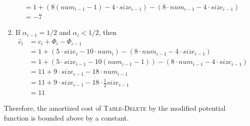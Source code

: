 \documentclass[12pt,letterpaper]{article}
\begin{document}
\begin{enumerate}
\begin{enumerate}
\begin{align*}
					&=1+(8(num_{i-1}-1)-4\cdot size_{i-1})-(8\cdot num_{i-1}-4\cdot size_{i-1})\\
					&=-7
				\end{align*}
			\item If $\alpha_{i-1}=1/2$ and $\alpha_i<1/2$, then
				\begin{align*}
					\widehat{c}_i&=c_i+\Phi_i-\Phi_{i-1}\\
					&=1+(5\cdot size_i-10\cdot num_i)-(8\cdot num_{i-1}-4\cdot size_{i-1})\\
					&=1+(5\cdot size_{i-1}-10(num_{i-1}-1))-(8\cdot num_{i-1}-4\cdot size_{i-1})\\
					&=11+9\cdot size_{i-1}-18\cdot num_{i-1}\\
					&=11+9\cdot size_{i-1}-18\cdot\frac{1}{2}size_{i-1}\\
					&=11
				\end{align*}
		\end{enumerate}
		Therefore, the amortized cost of \textsc{Table-Delete} by the modified potential function is bounded above by a constant.
\end{enumerate}
\end{document}
